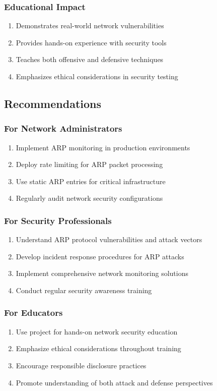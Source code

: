 \documentclass[12pt,a4paper]{article}
\begin{document}
\subsubsection{Educational Impact}
\begin{enumerate}
    \item Demonstrates real-world network vulnerabilities
    \item Provides hands-on experience with security tools
    \item Teaches both offensive and defensive techniques
    \item Emphasizes ethical considerations in security testing
\end{enumerate}

\subsection{Recommendations}

\subsubsection{For Network Administrators}
\begin{enumerate}
    \item Implement ARP monitoring in production environments
    \item Deploy rate limiting for ARP packet processing
    \item Use static ARP entries for critical infrastructure
    \item Regularly audit network security configurations
\end{enumerate}

\subsubsection{For Security Professionals}
\begin{enumerate}
    \item Understand ARP protocol vulnerabilities and attack vectors
    \item Develop incident response procedures for ARP attacks
    \item Implement comprehensive network monitoring solutions
    \item Conduct regular security awareness training
\end{enumerate}

\subsubsection{For Educators}
\begin{enumerate}
    \item Use project for hands-on network security education
    \item Emphasize ethical considerations throughout training
    \item Encourage responsible disclosure practices
    \item Promote understanding of both attack and defense perspectives
\end{enumerate}
\end{document}

